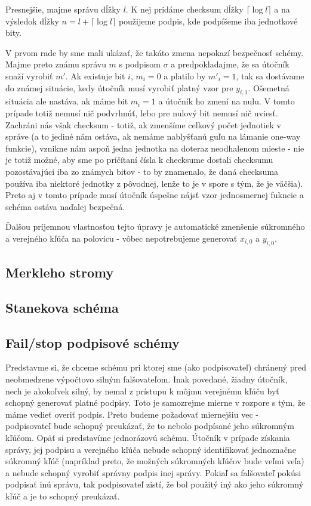 Presnejšie, majme správu dĺžky $l$. K nej pridáme checksum dĺžky
$\lceil \log l \rceil$ a na výsledok dĺžky $n=l+\lceil \log l \rceil$
použijeme podpis, kde podpíšeme iba jednotkové bity.

V prvom rade by sme mali ukázať, že takáto zmena nepokazí bezpečnosť
schémy. Majme preto známu správu $m$ s podpisom $\sigma$ a
predpokladajme, že sa útočník snaží vyrobiť $m'$.
Ak existuje bit $i$, $m_i=0$ a platilo by $m'_i=1$, tak sa dostávame
do známej situácie, kedy útočník musí vyrobiť platný vzor pre $y_{i,1}$.
Ošemetná situácia ale nastáva, ak máme bit $m_i=1$ a útočník ho zmení
na nulu. V tomto prípade totiž nemusí nič podvrhnúť, lebo pre nulový
bit nemusí nič uviesť. Zachráni nás však checksum - totiž, ak zmenšíme
celkový počet jednotiek v správe (a to jediné nám ostáva, ak nemáme
nablyšťanú guľu na lámanie one-way funkcie), vznikne nám aspoň jedna
jednotka na doteraz neodhalenom mieste - nie je totiž možné, aby sme
po pričítaní čísla k checksume dostali checksumu pozostávajúci iba zo
známych bitov - to by znamenalo, že daná checksuma používa iba
niektoré jednotky z pôvodnej, lenže to je v spore s tým, že je
väčšia). Preto aj v tomto prípade musí útočník úspešne nájsť vzor
jednosmernej fukncie a schéma ostáva naďalej bezpečná.

Ďalšou príjemnou vlastnosťou tejto úpravy je automatické zmenšenie
súkromného a verejného kľúča na polovicu - vôbec nepotrebujeme
generovať $x_{i,0}$ a $y_{i,0}$.

\subsection{Merkleho stromy}
\subsection{Stanekova schéma}
\subsection{Fail/stop podpisové schémy}

Predstavme si, že chceme schému pri ktorej sme (ako podpisovateľ) chránený pred neobmedzene výpočtovo silným
falšovateľom. Inak povedané, žiadny útočník, nech je akokoľvek silný,
by nemal z prístupu k môjmu verejnému kľúču byť schopný generovať
platné podpisy. Toto je samozrejme mierne v rozpore s tým, že máme
vedieť overiť podpis. Preto budeme požadovať miernejšiu vec -
podpisovateľ bude schopný preukázať, že to nebolo podpísané jeho
súkromným kľúčom.
Opäť si predstavíme jednorázovú schému. Útočník v prípade získania
správy, jej podpisu a verejného kľúča nebude schopný identifikovať
jednoznačne súkromný kľúč (napríklad preto, že možných súkromných
kľúčov bude veľmi veľa)
a nebude schopný vyrobiť správny podpis inej správy.
Pokiaľ sa falšovateľ pokúsi podpisať inú správu, tak podpisovateľ zistí, že bol použitý iný
ako jeho súkromný kľúč a je to schopný preukázať.

